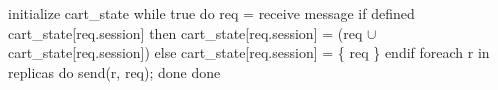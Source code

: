 





\begin{Dedalus}
initialize cart_state
while true do
  req = receive message
  if defined cart_state[req.session] then
     cart_state[req.session] =  
       (req \(\cup\) cart_state[req.session]) 
  else 
    cart_state[req.session] = \{ req \} 
  endif
  foreach r in replicas do
    send(r, req);
  done
done
\end{Dedalus}

